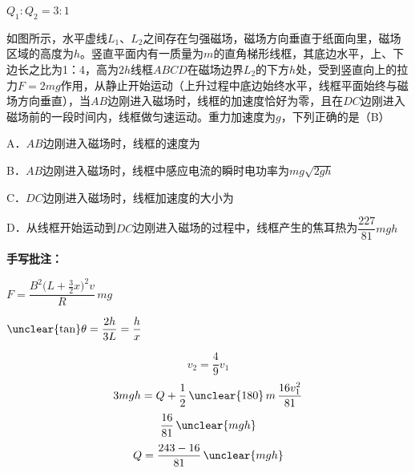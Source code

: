 $Q_1:Q_2=3:1$ %
\begin{problem}[18]
如图所示，水平虚线$L_1$、$L_2$之间存在匀强磁场，磁场方向垂直于纸面向里，磁场区域的高度为$h$。竖直平面内有一质量为$m$的直角梯形线框，其底边水平，上、下边长之比为1：4，高为$2h$线框$ABCD$在磁场边界$L_2$的下方$h$处，受到竖直向上的拉力$F=2mg$作用，从静止开始运动（上升过程中底边始终水平，线框平面始终与磁场方向垂直），当$AB$边刚进入磁场时，线框的加速度恰好为零，且在$DC$边刚进入磁场前的一段时间内，线框做匀速运动。重力加速度为$g$，下列正确的是（B）%


A．$AB$边刚进入磁场时，线框的速度为%

B．$AB$边刚进入磁场时，线框中感应电流的瞬时电功率为$mg\sqrt{2gh}$\ \unclear{$\checkmark$}%

C．$DC$边刚进入磁场时，线框加速度的大小为%

D．从线框开始运动到$DC$边刚进入磁场的过程中，线框产生的焦耳热为$\dfrac{227}{81}mgh$\ \red{$\checkmark$}%

\textbf{手写批注：}

$F=\dfrac{B^2\bigl(L+\frac{3}{2}x\bigr)^2v}{R}\,mg$%

$\unclear{\tan}\theta=\dfrac{2h}{3L}=\dfrac{h}{x}$\quad {}%
\end{problem}
\[
v_2=\frac{4}{9}v_1
\]
\[
3mgh=Q+\frac{1}{2}\,\unclear{180}\,m\,\frac{16v_1^{2}}{81}
\]%
\[
\frac{16}{81}\,\unclear{mgh}
\]%
\[
Q=\frac{243-16}{81}\,\unclear{mgh}
\]%

